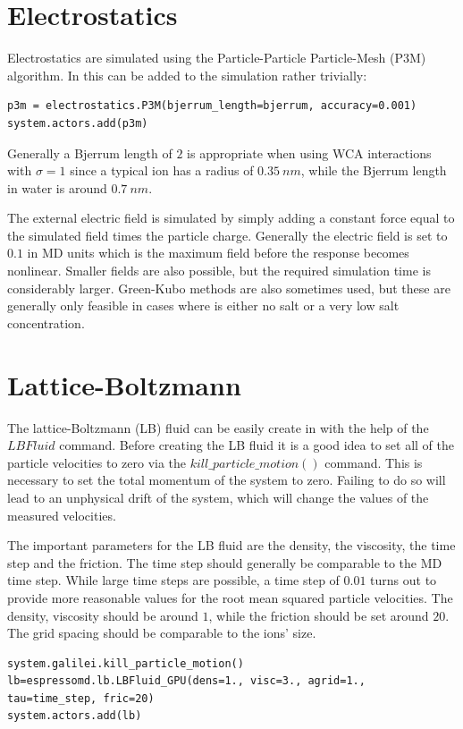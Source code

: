\documentclass[
paper=a4,                       %
fontsize=11pt,                  %
twoside,                        %
footsepline,                    %
headsepline,                    %
headinclude=false,              %
footinclude=false,              %
pagesize,                       %
]{scrartcl}
\begin{document}
\section{Electrostatics}
Electrostatics are simulated using the Particle-Particle Particle-Mesh (P3M) algorithm. In \es{} this can be added to the simulation rather trivially:
{\small\vspace{0,2cm}
\begin{lstlisting}[numbers=none]
p3m = electrostatics.P3M(bjerrum_length=bjerrum, accuracy=0.001)
system.actors.add(p3m)
\end{lstlisting}
}
Generally a Bjerrum length of $2$ is appropriate when using WCA interactions with $\sigma=1$ since a typical ion has a radius of $\SI{0.35}{nm}$, while the Bjerrum
length in water is around $\SI{0.7}{nm}$.

The external electric field is simulated by simply adding a constant force equal to the simulated field times the particle charge. Generally the electric field is set to $0.1$ in MD units
which is the maximum field before the response becomes nonlinear. Smaller fields are also possible, but the required simulation time is considerably larger. Green-Kubo methods
are also sometimes used, but these are generally only feasible in cases where is either no salt or a very low salt concentration.

\section{Lattice-Boltzmann}
The lattice-Boltzmann (LB) fluid can be easily create in \es{} with the help of the $LBFluid$ command.
Before creating the LB fluid it is a good idea to set all of the particle velocities to zero via the $kill\_particle\_motion()$ command.
This is necessary to set the total momentum of the system to zero. Failing to do so will lead to an unphysical drift of the system, which
will change the values of the measured velocities.

The important parameters for the LB fluid are the density, the viscosity, the time step and the friction. The time step should generally be comparable to the MD time step. While
large time steps are possible, a time step of $0.01$ turns out to provide more reasonable values for the root mean squared particle velocities. The density, viscosity
should be around $1$, while the friction should be set around $20.$ The grid spacing should be comparable to the ions' size.
{\small\vspace{0,2cm}
\begin{lstlisting}[numbers=none]
system.galilei.kill_particle_motion()
lb=espressomd.lb.LBFluid_GPU(dens=1., visc=3., agrid=1., tau=time_step, fric=20)
system.actors.add(lb)
\end{lstlisting}
}
\end{document}

